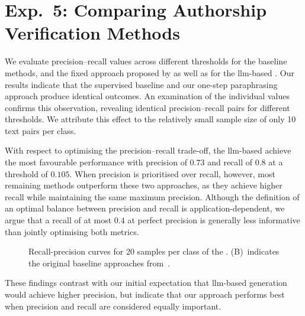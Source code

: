 \section{Exp.\ 5: Comparing Authorship Verification Methods}%
\label{subsec:imp_gen_res}

We evaluate precision–recall values across different thresholds for the baseline methods, and the fixed approach proposed by \citet{koppel_determining_2014} as well as for the \ac{llm}-based \impAppr{}.
Our results indicate that the supervised baseline and our one-step paraphrasing approach produce identical outcomes.
An examination of the individual values confirms this observation, revealing identical precision–recall pairs for different thresholds.
We attribute this effect to the relatively small sample size of only 10 text pairs per class.

With respect to optimising the precision–recall trade-off, the \ac{llm}-based \impAppr{} achieve the most favourable performance with precision of $0.73$ and recall of $0.8$ at a threshold of $0.105$.
When precision is prioritised over recall, however, most remaining methods outperform these two approaches, as they achieve higher recall while maintaining the same maximum precision.
Although the definition of an optimal balance between precision and recall is application-dependent, we argue that a recall of at most $0.4$ at perfect precision is generally less informative than jointly optimising both metrics.

\begin{figure}[htbp]
    \centering
    
    \caption[Recall-precision curves for the \dataStudent{}]{Recall-precision curves for 20 samples per class of the \dataStudent{}. 
    (B)~indicates the original baseline approaches from~\citep{koppel_determining_2014}.
    }
    \label{fig:comp_naive_student}
\end{figure}

These findings contrast with our initial expectation that \ac{llm}-based \imp{} generation would achieve higher precision, but indicate that our approach performs best when precision and recall are considered equally important.

